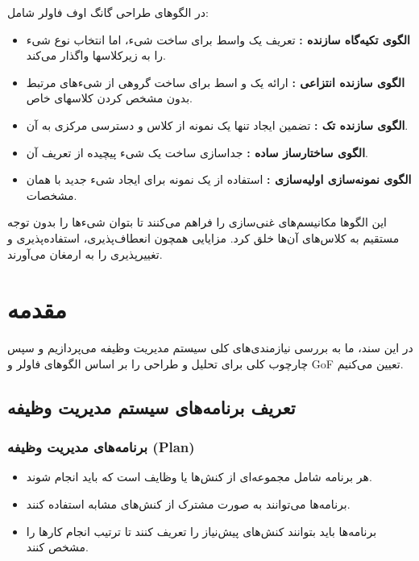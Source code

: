 در الگوهای طراحی گانگ اوف فاولر شامل:

\begin{itemize}
	\item \textbf{الگوی تکیه‌گاه سازنده :} تعریف یک واسط برای ساخت شیء، اما انتخاب نوع شیء را به زیرکلاسها واگذار می‌کند.
	\item \textbf{الگوی سازنده انتزاعی :} ارائه یک و
	اسط برای ساخت گروهی از شیءهای مرتبط بدون مشخص کردن کلاسهای خاص.
	\item \textbf{الگوی سازنده تک :} تضمین ایجاد تنها یک نمونه از کلاس و دسترسی مرکزی به آن.
	\item \textbf{الگوی ساختارساز ساده :} جداسازی ساخت یک شیء پیچیده از تعریف آن.
	\item \textbf{الگوی نمونه‌سازی اولیه‌سازی :} استفاده از یک نمونه برای ایجاد شیء جدید با همان مشخصات.
\end{itemize}

این الگوها مکانیسم‌های غنی‌سازی را فراهم می‌کنند تا بتوان شیءها را بدون توجه مستقیم به کلاس‌های آن‌ها خلق کرد. مزایایی همچون انعطاف‌پذیری، استفاده‌پذیری و تغییرپذیری را به ارمغان می‌آورند.

\section*{مقدمه}
در این سند، ما به بررسی نیازمندی‌های کلی سیستم مدیریت وظیفه می‌پردازیم و سپس چارچوب کلی برای تحلیل و طراحی را بر اساس الگوهای فاولر و GoF تعیین می‌کنیم.

\subsection*{تعریف برنامه‌های سیستم مدیریت وظیفه}

\subsubsection*{برنامه‌های مدیریت وظیفه (Plan)}

\begin{itemize}
	\item هر برنامه شامل مجموعه‌ای از کنش‌ها یا وظایف است که باید انجام شوند.
	\item برنامه‌ها می‌توانند به صورت مشترک از کنش‌های مشابه استفاده کنند.
	\item برنامه‌ها باید بتوانند کنش‌های پیش‌نیاز را تعریف کنند تا ترتیب انجام کارها را مشخص کنند.
\end{itemize}

